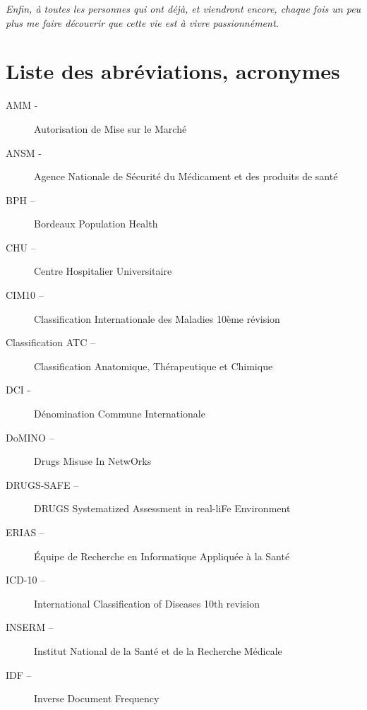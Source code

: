 \documentclass[a4paper, 12pt, openany, oneside, abstract=on]{article} %
\begin{document}
\begin{center}
    \emph{Enfin, à toutes les personnes qui ont déjà, et viendront encore, chaque fois un peu plus me faire découvrir que cette vie est à vivre passionnément.}
\end{center}

\newpage
\renewcommand{\contentsname}{Sommaire}
\setcounter{tocdepth}{4}

\newpage
\tableofcontents

\newpage
\listoffigures

\newpage
\listoftables

\newpage
\part*{Liste des abréviations, acronymes}
\begin{description}
 \item[AMM -] Autorisation de Mise sur le Marché
\item[ANSM -] Agence Nationale de Sécurité du Médicament et des produits de santé
\item[BPH –] \begin{it}Bordeaux Population Health\end{it}
\item[CHU –] Centre Hospitalier Universitaire
\item[CIM10 –] Classification Internationale des Maladies 10ème révision
\item[Classification ATC –] Classification Anatomique, Thérapeutique et Chimique
\item[DCI -] Dénomination Commune Internationale
\item[DoMINO –] \begin{it}Drugs Misuse In NetwOrks\end{it}
\item[DRUGS-SAFE –] \begin{it}DRUGS Systematized Assessment in real-liFe Environment\end{it}
\item[ERIAS –] Équipe de Recherche en Informatique Appliquée à la Santé
\item[ICD-10 –] \begin{it}International Classification of Diseases 10th revision\end{it}
\item[INSERM –] Institut National de la Santé et de la Recherche Médicale
\item[IDF –] \begin{it}Inverse Document Frequency\end{it}

\end{description}
\end{document}
